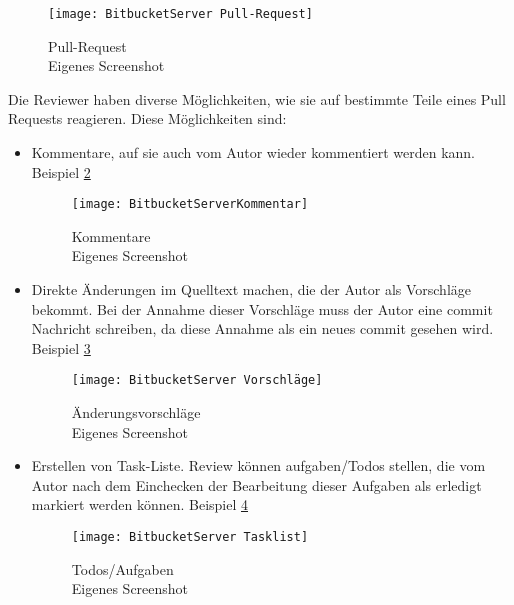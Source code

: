 \begin{figure}[H]
	\centering
	\texttt{[image: BitbucketServer Pull-Request]}
	\caption[Pull-Request auf Bitbucket-Server]{Pull-Request\\Eigenes Screenshot}
	\label{fig:BitbucketServer Pull-Request}
\end{figure}

Die Reviewer haben diverse Möglichkeiten, wie sie auf bestimmte Teile eines Pull Requests reagieren. Diese Möglichkeiten sind:
\begin{itemize}
	\item Kommentare, auf sie auch vom Autor wieder kommentiert werden kann. Beispiel \cref{fig:BitbucketServerKommentar}
	\begin{figure}[H]
		\centering
		\texttt{[image: BitbucketServerKommentar]}
		\caption[Bitbucket-Server Kommentare]{Kommentare\\Eigenes Screenshot}
		\label{fig:BitbucketServerKommentar}
	\end{figure}
	
	\item Direkte Änderungen im Quelltext machen, die der Autor als Vorschläge bekommt. Bei der Annahme dieser Vorschläge muss der Autor eine commit Nachricht schreiben, da diese 				Annahme als ein neues commit gesehen wird. Beispiel \cref{fig:BitbucketServer Vorschläge}
	\begin{figure}[H]
		\centering
		\texttt{[image: BitbucketServer Vorschläge]}
		\caption[Bitbucket-Server Änderungsvorschläge]{Änderungsvorschläge\\Eigenes Screenshot}
		\label{fig:BitbucketServer Vorschläge}
	\end{figure}
	
	
	\item Erstellen von Task-Liste. Review können aufgaben/Todos stellen, die vom Autor nach dem Einchecken der Bearbeitung dieser Aufgaben als erledigt markiert werden können. Beispiel 	\cref{fig:BitbucketServer Tasklist}
	\begin{figure}[H]
		\centering
		\texttt{[image: BitbucketServer Tasklist]}
		\caption[Bitbucket-Server Todos]{Todos/Aufgaben\\Eigenes Screenshot}
		\label{fig:BitbucketServer Tasklist}
	\end{figure}
\end{itemize}

